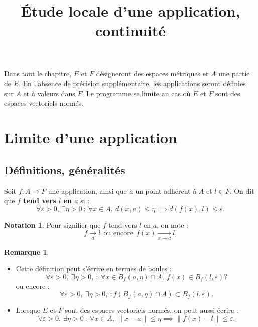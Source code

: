 \documentclass[french]{article}
\title{Étude locale d'une application, continuité}
\date{}
\theoremstyle{plain}
\theoremstyle{definition}
\newtheorem*{rmq}{Remarque}
\newtheorem*{notation}{Notation}
\theoremstyle{remark}
\begin{document}
\tableofcontents

\newpage
\maketitle

Dans tout le chapitre, $E$ et $F$ désigneront des espaces métriques et $A$ une partie de $E$. En l'absence de précision supplémentaire, les applications seront définies sur $A$ et à valeurs dans $F$. Le programme se limite au cas où $E$ et $F$ sont des espaces vectoriels normés.

\section{Limite d'une application}

\subsection{Définitions, généralités}

\begin{dfn}
	Soit $f:A\to F$ une application, ainsi que $a$ un point adhérent à $A$ et $l\in F$. On dit que \textbf{$f$ tend vers $l$ en $a$} si : $$\forall\varepsilon>0,\ \exists\eta>0\ :\ \forall x\in A,\ d(x,a)\leqslant\eta\implies d(f(x),l)\leqslant\varepsilon.$$
\end{dfn}

\begin{notation}
	Pour signifier que $f$ tend vers $l$ en $a$, on note :
$$f\xrightarrow[a]{}l\ \ \text{ou encore}\ \ f(x)\xrightarrow[x\to a]{}l.$$
\end{notation}

\begin{rmq}
	\begin{itemize}
		\item Cette définition peut s'écrire en termes de boules :
		$$\forall\varepsilon>0,\ \exists\eta>0,\ : \ \forall x\in B_f(a,\eta)\cap A,\ f(x)\in B_f(l,\varepsilon)?$$ ou encore :
		$$\forall\varepsilon>0,\ \exists\eta>0,\ : f(B_f(a,\eta)\cap A)\subset B_f(l,\varepsilon).$$
		\item Lorsque $E$ et $F$ sont des espaces vectoriels normés, on peut aussi écrire : 
		$$\forall\varepsilon>0,\ \exists\eta>0\ :\ \forall x\in A,\ \lVert x-a\rVert\leqslant\eta\implies \lVert f(x)-l\rVert\leqslant\varepsilon.$$
	\end{itemize}
\end{rmq}
\end{document}
